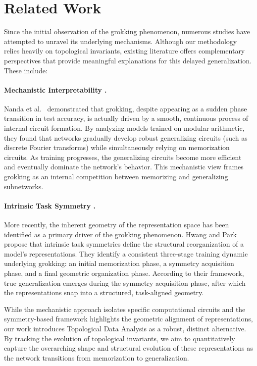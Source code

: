 \section{Related Work}

Since the initial observation of the grokking phenomenon, numerous studies have attempted to unravel its underlying mechanisms. Although our methodology relies heavily on topological invariants, existing literature offers complementary perspectives that provide meaningful explanations for this delayed generalization. These include:

\paragraph{Mechanistic Interpretability \cite{nanda2023progressmeasuresgrokkingmechanistic}.} 
Nanda et al.~\cite{nanda2023progressmeasuresgrokkingmechanistic} demonstrated that grokking, despite appearing as a sudden phase transition in test accuracy, is actually driven by a smooth, continuous process of internal circuit formation. By analyzing models trained on modular arithmetic, they found that networks gradually develop robust generalizing circuits (such as discrete Fourier transforms) while simultaneously relying on memorization circuits. As training progresses, the generalizing circuits become more efficient and eventually dominate the network's behavior. This mechanistic view frames grokking as an internal competition between memorizing and generalizing subnetworks.

\paragraph{Intrinsic Task Symmetry \cite{hwang2026intrinsic}.}
More recently, the inherent geometry of the representation space has been identified as a primary driver of the grokking phenomenon. Hwang and Park~\cite{hwang2026intrinsic} propose that intrinsic task symmetries define the structural reorganization of a model's representations. They identify a consistent three-stage training dynamic underlying grokking: an initial memorization phase, a symmetry acquisition phase, and a final geometric organization phase. According to their framework, true generalization emerges during the symmetry acquisition phase, after which the representations snap into a structured, task-aligned geometry.

While the mechanistic approach isolates specific computational circuits and the symmetry-based framework highlights the geometric alignment of representations, our work introduces Topological Data Analysis as a robust, distinct alternative. By tracking the evolution of topological invariants, we aim to quantitatively capture the overarching shape and structural evolution of these representations as the network transitions from memorization to generalization.